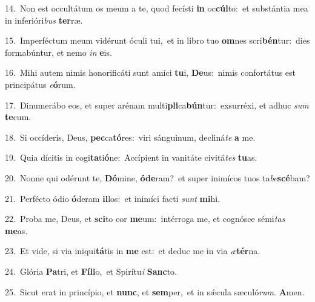 {\numbfont\textcolor{\numbcolor}{14.}}~Non est occultátum os meum a te, quod fecísti \textbf{in} oc\-\textbf{cúl}\-to:~\star et substántia mea in inferióri\textit{bus} \textbf{ter}\-ræ.\par
{\numbfont\textcolor{\numbcolor}{15.}}~Imperféctum meum vidérunt óculi tui,~\dagger et in libro tuo \textbf{om}\-nes scri\-\textbf{bén}\-tur:~\star dies formabúntur, et nemo \textit{in} \textbf{e}\-is.\par
{\numbfont\textcolor{\numbcolor}{16.}}~Mihi autem nimis honorificáti sunt amíci \textbf{tu}\-i, \textbf{De}\-us:~\star nimis confortátus est principátus \textit{e}\-\textbf{ó}rum.\par
{\numbfont\textcolor{\numbcolor}{17.}}~Dinumerábo eos, et super arénam multi\-\textbf{pli}\-ca\-\textbf{bún}\-tur:~\star exsurréxi, et adhuc \textit{sum} \textbf{te}\-cum.\par
{\numbfont\textcolor{\numbcolor}{18.}}~Si occíderis, Deus, \textbf{pec}\-ca\-\textbf{tó}\-res:~\star viri sánguinum, decliná\textit{te} \textbf{a} me.\par
{\numbfont\textcolor{\numbcolor}{19.}}~Quia dícitis in cogi\-\textbf{ta}\-ti\-\textbf{ó}\-ne:~\star Accípient in vanitáte civitá\textit{tes} \textbf{tu}\-as.\par
{\numbfont\textcolor{\numbcolor}{20.}}~Nonne qui odérunt te, \textbf{Dó}\-mine, \textbf{ó}\-\textbf{de}ram?~\star et super inimícos tuos ta\-\textit{be}\-\textbf{scé}bam?\par
{\numbfont\textcolor{\numbcolor}{21.}}~Perfécto ódio \textbf{ó}\-deram \textbf{il}\-los:~\star et inimíci facti \textit{sunt} \textbf{mi}\-hi.\par
{\numbfont\textcolor{\numbcolor}{22.}}~Proba me, Deus, et \textbf{sci}\-to cor \textbf{me}\-um:~\star intérroga me, et cognósce sémi\textit{tas} \textbf{me}\-as.\par
{\numbfont\textcolor{\numbcolor}{23.}}~Et vide, si via iniqui\-\textbf{tá}\-tis in \textbf{me} est:~\star et deduc me in via \textit{æ}\-\textbf{tér}na.\par
{\numbfont\textcolor{\numbcolor}{24.}}~Glória \textbf{Pa}\-tri, et \textbf{Fí}\-\textbf{li}o,~\star et Spirítu\textit{i} \textbf{Sanc}\-to.\par
{\numbfont\textcolor{\numbcolor}{25.}}~Sicut erat in princípio, et \textbf{nunc}\-, et \textbf{sem}\-per,~\star et in sǽcula sæculó\-\textit{rum}\-. \textbf{A}\-men.\par
